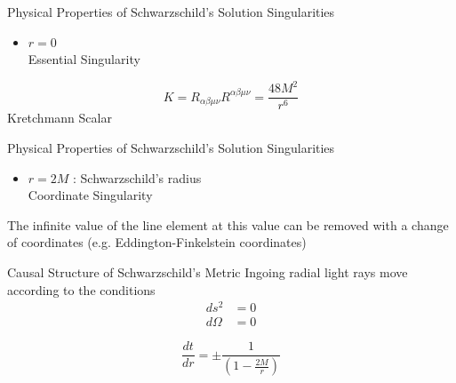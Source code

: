 \documentclass{beamer}
\begin{document}
\begin{darkframes}
        \begin{frame}{Physical Properties of Schwarzschild's Solution}
    		Singularities
            \begin{itemize}
				\item $r = 0$ \\
                \pause
                Essential Singularity
            \end{itemize}
            \pause
            \bigskip
            
            $$ K = R_{\alpha\beta\mu\nu} R^{\alpha\beta\mu\nu} = \frac{48M^{2}}{r^{6}}$$
            \centering
            {Kretchmann Scalar}
    	\end{frame}
        
        \begin{frame}{Physical Properties of Schwarzschild's Solution}
    		Singularities
            \begin{itemize}
				\item $r = 2M$  : Schwarzschild's radius\\
                \pause
                Coordinate Singularity
            \end{itemize}
            \pause
            \bigskip
            
            The infinite value of the line element at this value can be
removed with a change of coordinates (e.g. Eddington-Finkelstein
coordinates)
    	\end{frame}
        
        \begin{frame}{Causal Structure of Schwarzschild's Metric}
            Ingoing radial light rays move according to the conditions
            \begin{align*}
            	ds^2 &= 0\\ 
            	d\Omega &= 0
            \end{align*}
            \pause
            \bigskip
            
            $$ \frac{dt}{dr}=\pm\frac{1}{\left(1-\frac{2M}{r}\right)} $$
    	\end{frame}
  
  \end{darkframes}        
\end{document}
